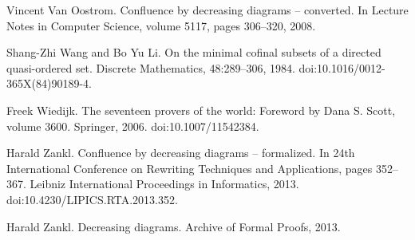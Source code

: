 \par\noindent  [42]  Vincent Van Oostrom.  Confluence by decreasing diagrams – converted.  In Lecture Notes in Computer Science, volume 5117, pages 306–320, 2008.  
 
\par\noindent  [43]  Shang-Zhi Wang and Bo Yu Li.  On the minimal cofinal subsets of a directed quasi-ordered set.  Discrete Mathematics, 48:289–306, 1984.  doi:10.1016/0012-365X(84)90189-4.  
 
\par\noindent  [44]  Freek Wiedijk.  The seventeen provers of the world: Foreword by Dana S. Scott, volume 3600.  Springer, 2006.  doi:10.1007/11542384.  
 
\par\noindent  [45]  Harald Zankl.  Confluence by decreasing diagrams – formalized.  In 24th International Conference on Rewriting Techniques and Applications, pages 352–367. Leibniz International Proceedings in Informatics, 2013.  doi:10.4230/LIPICS.RTA.2013.352.  
 
\par\noindent  [46]  Harald Zankl.  Decreasing diagrams.  Archive of Formal Proofs, 2013.  
  
